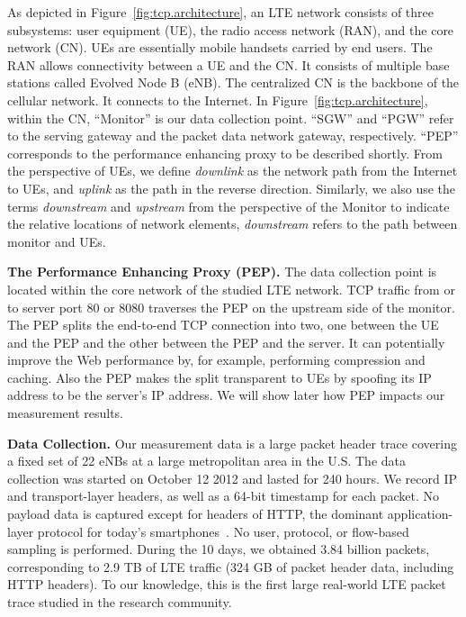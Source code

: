 As depicted in Figure~\ref{fig:tcp.architecture}, an LTE network consists of three subsystems: user equipment (UE), the radio access network (RAN), and the core network (CN).
UEs are essentially mobile handsets carried by
end users. The RAN allows connectivity between a UE
and the CN. It consists of multiple base stations called Evolved Node B (eNB).
The centralized CN is the backbone of the cellular network. It connects to the Internet. In Figure~\ref{fig:tcp.architecture}, within the CN, ``Monitor'' is our data collection point. ``SGW'' and ``PGW'' refer to the serving gateway and the packet data network gateway, respectively. ``PEP'' corresponds to the performance enhancing proxy to be described shortly. From the perspective of UEs, we define \emph{downlink} as the network path from the Internet to UEs, and \emph{uplink} as the path in the reverse direction. Similarly, we also use the terms \emph{downstream} and \emph{upstream} from the perspective of the Monitor to indicate the relative locations of network elements, \eg \emph{downstream} refers to the path between monitor and UEs.

\textbf{The Performance Enhancing Proxy (PEP).}
The data collection point is located within the core network of the studied LTE network. TCP traffic from or to server port 80 or 8080 traverses the PEP on the upstream side of the monitor. The PEP splits the end-to-end TCP connection into two, one between the UE and the PEP and the other between the PEP and the server. It can potentially improve the Web performance by, for example, performing compression and caching. Also the PEP makes the split transparent to UEs by spoofing its IP address to be the server's IP address. We will show later how PEP impacts our measurement results.

\textbf{Data Collection.} Our measurement data is a large packet header trace covering a fixed set of 22 eNBs at a large metropolitan area in the U.S. The data collection was started on October 12 2012 and lasted for 240 hours. We record IP and transport-layer headers, as well as a 64-bit timestamp for each packet. No payload data is captured except for headers of HTTP, the dominant application-layer protocol for today's smartphones~\cite{xu11_imc}. No user, protocol, or flow-based sampling is performed. During the 10 days, we obtained 3.84 billion packets, corresponding to 2.9 TB of LTE traffic (324 GB of packet header data, including HTTP headers). To our knowledge, this is the first large real-world LTE packet trace studied in the research community.

